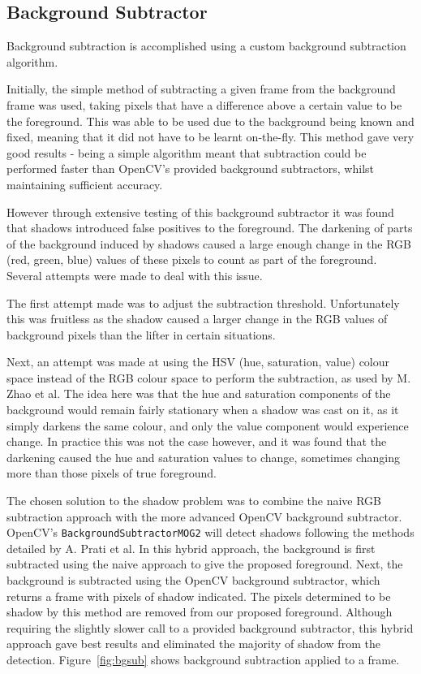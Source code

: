 \subsection{Background Subtractor}
\label{subsec:bgsub}

Background subtraction is accomplished using a custom background subtraction algorithm.

Initially, the simple method of subtracting a given frame from the background frame was used, taking pixels that have a difference above a certain value to be the foreground. This was able to be used due to the background being known and fixed, meaning that it did not have to be learnt on-the-fly. This method gave very good results - being a simple algorithm meant that subtraction could be performed faster than OpenCV's provided background subtractors, whilst maintaining sufficient accuracy.

However through extensive testing of this background subtractor it was found that shadows introduced false positives to the foreground. The darkening of parts of the background induced by shadows caused a large enough change in the RGB (red, green, blue) values of these pixels to count as part of the foreground. Several attempts were made to deal with this issue.

The first attempt made was to adjust the subtraction threshold. Unfortunately this was fruitless as the shadow caused a larger change in the RGB values of background pixels than the lifter in certain situations.

Next, an attempt was made at using the HSV (hue, saturation, value) colour space instead of the RGB colour space to perform the subtraction, as used by M. Zhao et al\cite{bgsubhsv}. The idea here was that the hue and saturation components of the background would remain fairly stationary when a shadow was cast on it, as it simply darkens the same colour, and only the value component would experience change. In practice this was not the case however, and it was found that the darkening caused the hue and saturation values to change, sometimes changing more than those pixels of true foreground.

The chosen solution to the shadow problem was to combine the naive RGB subtraction approach with the more advanced OpenCV background subtractor. OpenCV's \texttt{Background\allowbreak SubtractorMOG2} will detect shadows following the methods detailed by A. Prati et al\cite{bgsubmog2}. In this hybrid approach, the background is first subtracted using the naive approach to give the proposed foreground. Next, the background is subtracted using the OpenCV background subtractor, which returns a frame with pixels of shadow indicated. The pixels determined to be shadow by this method are removed from our proposed foreground. Although requiring the slightly slower call to a provided background subtractor, this hybrid approach gave best results and eliminated the majority of shadow from the detection. Figure~\ref{fig:bgsub} shows background subtraction applied to a frame.

